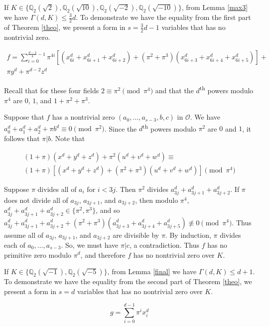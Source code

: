\documentclass[12pt]{amsart}
\begin{document}
If $K \in \{\mathbb{Q}_2(\sqrt{2}), \mathbb{Q}_2(\sqrt{10}), \mathbb{Q}_2(\sqrt{-2}), \mathbb{Q}_2(\sqrt{-10})\}$, from Lemma \ref{max3} we have $\Gamma(d, K) \le \frac{3}{2}d$.  To demonstrate we have the equality from the first part of Theorem \ref{theo}, we present a form in $s = \frac{3}{2}d - 1$ variables that has no nontrivial zero.

\begin{align*}
f = \sum_{i=0}^{\frac{d-2}{4} - 1} \pi^{4i}[(x_{6i}^d + x_{6i+1}^d + x_{6i+2}^d) + (\pi^2+\pi^3)(x_{6i+3}^d + x_{6i+4}^d + x_{6i+5}^d)] + \\
\pi y^d + \pi^{d-2}z^d
\end{align*}

Recall that for these four fields $2 \equiv \pi^2 \pmod{\pi^4}$ and that the $d$\textsuperscript{th} powers modulo $\pi^4$ are $0$, $1$, and $1 + \pi^2 + \pi^3$.

Suppose that $f$ has a nontrivial zero $(a_0, \ldots, a_{s-3}, b, c)$ in $\mathcal{O}$.  We have $a_0^d + a_1^d + a_2^d + \pi b^d \equiv 0 \pmod{\pi^2}$.  Since the $d$\textsuperscript{th} powers modulo $\pi^2$ are $0$ and $1$, it follows that $\pi | b$.  Note that

\begin{align*}
    (1 + \pi)(x^d + y^d + z^d) + \pi^2(u^d + v^d + w^d) \equiv \\
    (1 + \pi)[(x^d + y^d + z^d) + (\pi^2 + \pi^3)(u^d + v^d + w^d)] \pmod{\pi^4}
\end{align*}

Suppose $\pi$ divides all of $a_i$ for $i < 3j$.  Then $\pi^2$ divides $a_{3j}^d + a_{3j+1}^d + a_{3j+2}^d$.  If $\pi$ does not divide all of $a_{3j}$, $a_{3j+1}$, and $a_{3j+2}$, then modulo $\pi^4$, $a_{3j}^d + a_{3j+1}^d + a_{3j+2}^d \in \{\pi^2, \pi^3\}$, and so $a_{3j}^d + a_{3j+1}^d + a_{3j+2}^d + (\pi^2 + \pi^3)(a_{3j+3}^d + a_{3j+4}^d + a_{3j+5}^d) \not \equiv 0 \pmod{\pi^4}$.  Thus assume all of $a_{3j}$, $a_{3j+1}$, and $a_{3j+2}$ are divisible by $\pi$.  By induction, $\pi$ divides each of $a_0, \ldots, a_{s-3}$.  So, we must have $\pi | c$, a contradiction.  Thus $f$ has no primitive zero modulo $\pi^d$, and therefore $f$ has no nontrivial zero over $K$.

If $K \in \{\mathbb{Q}_2(\sqrt{-1}), \mathbb{Q}_2(\sqrt{-5})\}$, from Lemma \ref{final} we have $\Gamma(d, K) \le d+1$.  To demonstrate we have the equality from the second part of Theorem \ref{theo}, we present a form in $s = d$ variables that has no nontrivial zero over $K$.

$$g = \sum_{i=0}^{d-1} \pi^i x_i^d$$



\end{document}
